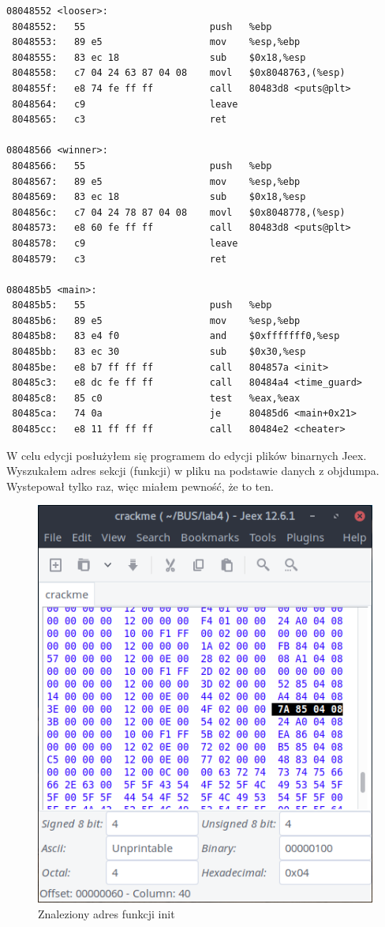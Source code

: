 \documentclass[a4paper]{article}
\begin{document}
	\begin{lstlisting}[caption={Fragment objdumpa}, captionpos=b]
08048552 <looser>:
 8048552:	55                   	push   %ebp
 8048553:	89 e5                	mov    %esp,%ebp
 8048555:	83 ec 18             	sub    $0x18,%esp
 8048558:	c7 04 24 63 87 04 08 	movl   $0x8048763,(%esp)
 804855f:	e8 74 fe ff ff       	call   80483d8 <puts@plt>
 8048564:	c9                   	leave  
 8048565:	c3                   	ret    

08048566 <winner>:
 8048566:	55                   	push   %ebp
 8048567:	89 e5                	mov    %esp,%ebp
 8048569:	83 ec 18             	sub    $0x18,%esp
 804856c:	c7 04 24 78 87 04 08 	movl   $0x8048778,(%esp)
 8048573:	e8 60 fe ff ff       	call   80483d8 <puts@plt>
 8048578:	c9                   	leave  
 8048579:	c3                   	ret    

080485b5 <main>:
 80485b5:	55                   	push   %ebp
 80485b6:	89 e5                	mov    %esp,%ebp
 80485b8:	83 e4 f0             	and    $0xfffffff0,%esp
 80485bb:	83 ec 30             	sub    $0x30,%esp
 80485be:	e8 b7 ff ff ff       	call   804857a <init>
 80485c3:	e8 dc fe ff ff       	call   80484a4 <time_guard>
 80485c8:	85 c0                	test   %eax,%eax
 80485ca:	74 0a                	je     80485d6 <main+0x21>
 80485cc:	e8 11 ff ff ff       	call   80484e2 <cheater>
	\end{lstlisting}
	
	W celu edycji posłużyłem się programem do edycji plików binarnych Jeex. Wyszukałem adres sekcji (funkcji) w pliku na podstawie danych z objdumpa. Wystepował tylko raz, więc miałem pewność, że to ten.
	
	\begin{figure}[H]
		\centering
		\includegraphics[width=.4\textwidth]{img/init_addr}
		\caption{Znaleziony adres funkcji init}
	\end{figure}
\end{document}
